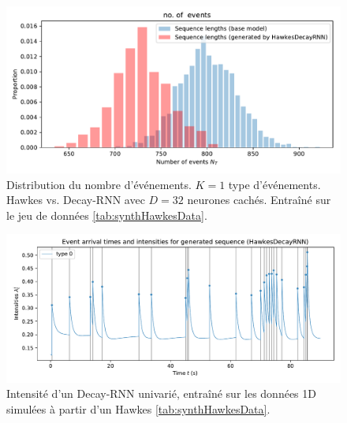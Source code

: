 \documentclass[../main.tex]{subfiles}
\begin{document}
\begin{figure}[ht]
	\includegraphics[width=\linewidth]{../results/seq_length_distrib_HawkesDecayRNN-1d-hidden_32-20181205-230630.pdf}
	\caption{Distribution du nombre d'événements. $K=1$ type d'événements. Hawkes vs. Decay-RNN avec $D=32$ neurones cachés. Entraîné sur le jeu de données \autoref{tab:synthHawkesData}.}\label{fig:1DRNNlengthDistrib}
\end{figure}

\begin{figure}[ht]
	\includegraphics[width=\linewidth]{../results/intensity_HawkesDecayRNN_1d_hidden32_20181205-230630.pdf}
	\caption{Intensité d'un Decay-RNN univarié, entraîné sur les données 1D simulées à partir d'un Hawkes \autoref{tab:synthHawkesData}.}\label{fig:1DRNNintensityPlot}
\end{figure}
\end{document}
